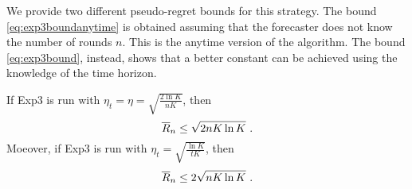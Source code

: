 We provide two different pseudo-regret bounds for this strategy. The bound \eqref{eq:exp3boundanytime} is obtained assuming that the forecaster does not know the number of rounds $n$. This is the anytime version of the algorithm. The bound \eqref{eq:exp3bound}, instead, shows that a better constant can be achieved using the knowledge of the time horizon.
%
\begin{theorem} \label{th:Exp3}
If Exp3 is run with $\eta_t=\eta = \sqrt{\frac{2 \ln K}{n K}}$, then
\begin{equation} \label{eq:exp3bound}
\overline{R}_n \leq \sqrt{2 n K \ln K}~.
\end{equation}
Moeover, if Exp3 is run with $\eta_t = \sqrt{\frac{\ln K}{t K}}$, then
\begin{equation} \label{eq:exp3boundanytime}
\overline{R}_n \leq 2 \sqrt{n K \ln K}~.
\end{equation}
\end{theorem}
%
